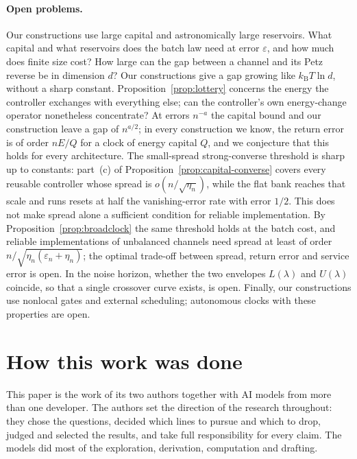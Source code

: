 \documentclass[11pt]{article}
\theoremstyle{definition}
\theoremstyle{remark}
\newcommand{\kB}{k_{\mathrm B}}
\begin{document}
\paragraph{Open problems.} Our constructions use large capital and astronomically large reservoirs. What capital and what reservoirs does the batch law need at error $\varepsilon$, and how much does finite size cost? How large can the gap between a channel and its Petz reverse be in dimension $d$? Our constructions give a gap growing like $\kB T\ln d$, without a sharp constant. Proposition~\ref{prop:lottery} concerns the energy the controller exchanges with everything else; can the controller's own energy-change operator nonetheless concentrate? At errors $n^{-a}$ the capital bound and our construction leave a gap of $n^{a/2}$; in every construction we know, the return error is of order $nE/Q$ for a clock of energy capital $Q$, and we conjecture that this holds for every architecture. The small-spread strong-converse threshold is sharp up to constants: part~(c) of Proposition~\ref{prop:capital-converse} covers every reusable controller whose spread is $o(n/\sqrt{\eta_n})$, while the flat bank reaches that scale and runs resets at half the vanishing-error rate with error $1/2$. This does not make spread alone a sufficient condition for reliable implementation. By Proposition~\ref{prop:broadclock} the same threshold holds at the batch cost, and reliable implementations of unbalanced channels need spread at least of order $n/\sqrt{\eta_n(\varepsilon_n+\eta_n)}$; the optimal trade-off between spread, return error and service error is open. In the noise horizon, whether the two envelopes $L(\lambda)$ and $U(\lambda)$ coincide, so that a single crossover curve exists, is open. Finally, our constructions use nonlocal gates and external scheduling; autonomous clocks with these properties are open.

\section*{How this work was done}
This paper is the work of its two authors together with AI models from more than one developer. The authors set the direction of the research throughout: they chose the questions, decided which lines to pursue and which to drop, judged and selected the results, and take full responsibility for every claim. The models did most of the exploration, derivation, computation and drafting.
\end{document}
